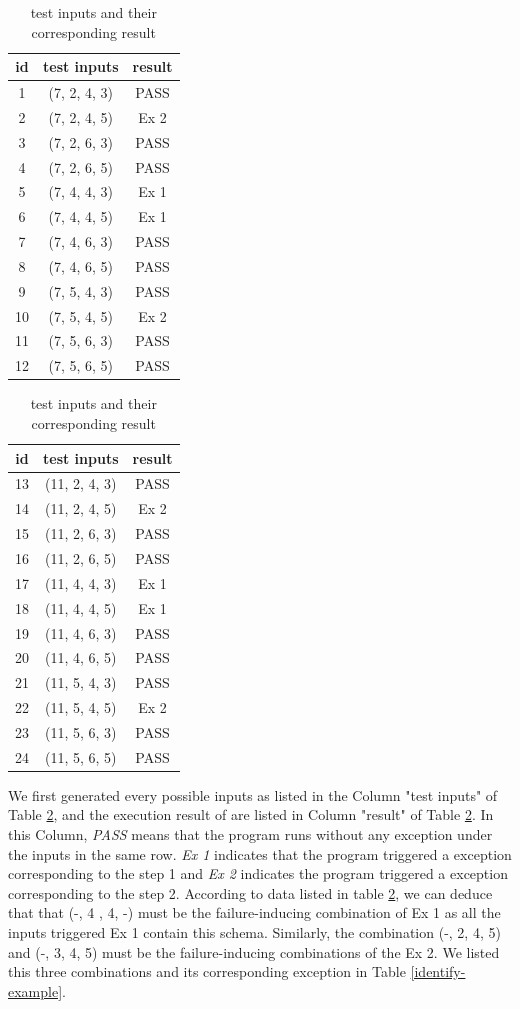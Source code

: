\documentclass{sig-alternate}
\begin{document}
\begin{table}[!ht]
  \caption{test inputs and their corresponding result}\label{test-example}
  \centering
  \begin{tabular}{ccc}
id&test inputs & result\\\hline
1&(7, 2, 4, 3) &  PASS\\ \hline
2&(7, 2, 4, 5) &  Ex 2\\ \hline
3&(7, 2, 6, 3) &  PASS\\ \hline
4&(7, 2, 6, 5) &  PASS\\ \hline
5&(7, 4, 4, 3) &  Ex 1\\ \hline
6&(7, 4, 4, 5) &  Ex 1\\ \hline
7&(7, 4, 6, 3) &  PASS\\ \hline
8&(7, 4, 6, 5) &  PASS\\ \hline
9&(7, 5, 4, 3) &  PASS\\ \hline
10&(7, 5, 4, 5) &  Ex 2\\ \hline
11&(7, 5, 6, 3) &  PASS\\ \hline
12&(7, 5, 6, 5) &  PASS\\ \hline
  \end{tabular}
  \hspace{1em}
  \begin{tabular}{ccc}
id&test inputs & result\\\hline
13&(11, 2, 4, 3)& PASS\\ \hline
14&(11, 2, 4, 5)& Ex 2\\ \hline
15&(11, 2, 6, 3)& PASS\\ \hline
16&(11, 2, 6, 5)& PASS\\ \hline
17&(11, 4, 4, 3)& Ex 1\\ \hline
18&(11, 4, 4, 5)& Ex 1\\ \hline
19&(11, 4, 6, 3)& PASS\\ \hline
20&(11, 4, 6, 5)& PASS\\ \hline
21&(11, 5, 4, 3)& PASS\\ \hline
22&(11, 5, 4, 5)& Ex 2\\ \hline
23&(11, 5, 6, 3)& PASS\\ \hline
24&(11, 5, 6, 5)& PASS\\ \hline
  \end{tabular}
  \end{table}

We first generated every possible inputs as listed in the Column "test inputs" of Table \ref{test-example}, and the execution result of are listed in Column "result" of Table \ref{test-example}. In this Column, \emph{PASS} means that the program runs without any exception under the inputs in the same row. \emph{Ex 1} indicates that the program triggered a exception corresponding to the step 1 and \emph{Ex 2} indicates the program triggered a exception corresponding to the step 2. According to data listed in table \ref{test-example}, we can deduce that that (-, 4 , 4, -) must be the failure-inducing combination of Ex 1 as all the inputs triggered Ex 1 contain this schema. Similarly, the combination (-, 2, 4, 5) and  (-, 3, 4, 5) must be the failure-inducing combinations of the Ex 2. We listed this three combinations and its corresponding exception in Table \ref{identify-example}.
\end{document}
